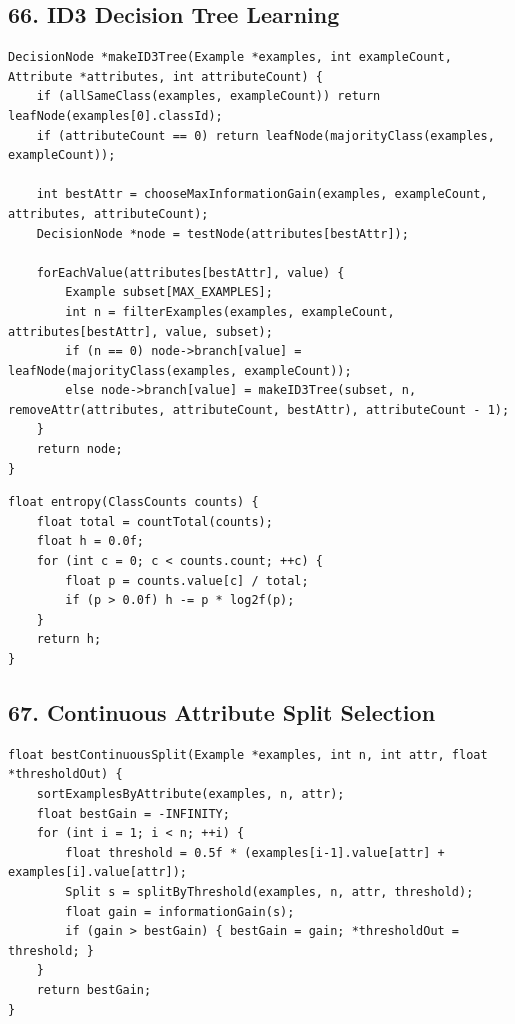 \documentclass[10pt,letterpaper]{article}
\begin{document}
\subsection*{66. ID3 Decision Tree Learning}
{}

\begin{verbatim}
DecisionNode *makeID3Tree(Example *examples, int exampleCount, Attribute *attributes, int attributeCount) {
    if (allSameClass(examples, exampleCount)) return leafNode(examples[0].classId);
    if (attributeCount == 0) return leafNode(majorityClass(examples, exampleCount));

    int bestAttr = chooseMaxInformationGain(examples, exampleCount, attributes, attributeCount);
    DecisionNode *node = testNode(attributes[bestAttr]);

    forEachValue(attributes[bestAttr], value) {
        Example subset[MAX_EXAMPLES];
        int n = filterExamples(examples, exampleCount, attributes[bestAttr], value, subset);
        if (n == 0) node->branch[value] = leafNode(majorityClass(examples, exampleCount));
        else node->branch[value] = makeID3Tree(subset, n, removeAttr(attributes, attributeCount, bestAttr), attributeCount - 1);
    }
    return node;
}
\end{verbatim}

\begin{verbatim}
float entropy(ClassCounts counts) {
    float total = countTotal(counts);
    float h = 0.0f;
    for (int c = 0; c < counts.count; ++c) {
        float p = counts.value[c] / total;
        if (p > 0.0f) h -= p * log2f(p);
    }
    return h;
}
\end{verbatim}

\subsection*{67. Continuous Attribute Split Selection}
{}

\begin{verbatim}
float bestContinuousSplit(Example *examples, int n, int attr, float *thresholdOut) {
    sortExamplesByAttribute(examples, n, attr);
    float bestGain = -INFINITY;
    for (int i = 1; i < n; ++i) {
        float threshold = 0.5f * (examples[i-1].value[attr] + examples[i].value[attr]);
        Split s = splitByThreshold(examples, n, attr, threshold);
        float gain = informationGain(s);
        if (gain > bestGain) { bestGain = gain; *thresholdOut = threshold; }
    }
    return bestGain;
}
\end{verbatim}
\end{document}
